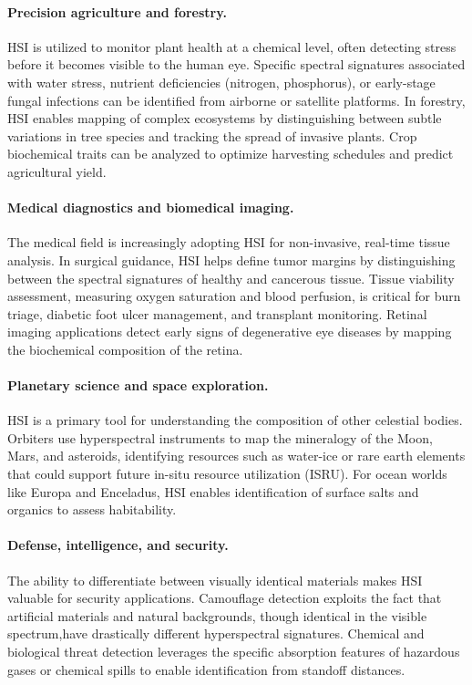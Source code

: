 \documentclass[11pt]{report}
\begin{document}
\paragraph{Precision agriculture and forestry.}
HSI is utilized to monitor plant health at a chemical level, often detecting stress before it becomes visible to the human eye. 
Specific spectral signatures associated with water stress, nutrient deficiencies (nitrogen, phosphorus), or early-stage fungal infections can be identified from airborne or satellite platforms. 
In forestry, HSI enables mapping of complex ecosystems by distinguishing between subtle variations in tree species and tracking the spread of invasive plants. 
Crop biochemical traits can be analyzed to optimize harvesting schedules and predict agricultural yield.

\paragraph{Medical diagnostics and biomedical imaging.}
The medical field is increasingly adopting HSI for non-invasive, real-time tissue analysis. 
In surgical guidance, HSI helps define tumor margins by distinguishing between the spectral signatures of healthy and cancerous tissue. 
Tissue viability assessment, measuring oxygen saturation and blood perfusion, is critical for burn triage, diabetic foot ulcer management, and transplant monitoring. 
Retinal imaging applications detect early signs of degenerative eye diseases by mapping the biochemical composition of the retina.

\paragraph{Planetary science and space exploration.}
HSI is a primary tool for understanding the composition of other celestial bodies. 
Orbiters use hyperspectral instruments to map the mineralogy of the Moon, Mars, and asteroids, identifying resources such as water-ice or rare earth elements that could support future in-situ resource utilization (ISRU). 
For ocean worlds like Europa and Enceladus, HSI enables identification of surface salts and organics to assess habitability.

\paragraph{Defense, intelligence, and security.}
The ability to differentiate between visually identical materials makes HSI valuable for security applications. 
Camouflage detection exploits the fact that artificial materials and natural backgrounds, though identical in the visible spectrum,have drastically different hyperspectral signatures. 
Chemical and biological threat detection leverages the specific absorption features of hazardous gases or chemical spills to enable identification from standoff distances.
\end{document}
